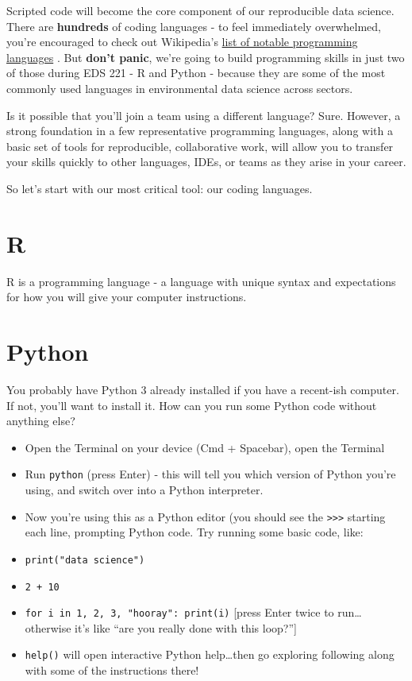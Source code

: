 \documentclass[
]{book}
\begin{document}
Scripted code will become the core component of our reproducible data science. There are \textbf{hundreds} of coding languages - to feel immediately overwhelmed, you're encouraged to check out Wikipedia's \href{https://en.wikipedia.org/wiki/List_of_programming_languages}{list of notable programming languages} \citep{enwiki_1014039839}. But \textbf{don't panic}, we're going to build programming skills in just two of those during EDS 221 - R and Python - because they are some of the most commonly used languages in environmental data science across sectors.

Is it possible that you'll join a team using a different language? Sure. However, a strong foundation in a few representative programming languages, along with a basic set of tools for reproducible, collaborative work, will allow you to transfer your skills quickly to other languages, IDEs, or teams as they arise in your career.

So let's start with our most critical tool: our coding languages.

\hypertarget{r}{%
\section{R}\label{r}}

R is a programming language - a language with unique syntax and expectations for how you will give your computer instructions.

\hypertarget{python}{%
\section{Python}\label{python}}

You probably have Python 3 already installed if you have a recent-ish computer. If not, you'll want to install it. How can you run some Python code without anything else?

\begin{itemize}
\item
  Open the Terminal on your device (Cmd + Spacebar), open the Terminal
\item
  Run \texttt{python} (press Enter) - this will tell you which version of Python you're using, and switch over into a Python interpreter.
\item
  Now you're using this as a Python editor (you should see the \texttt{\textgreater{}\textgreater{}\textgreater{}} starting each line, prompting Python code. Try running some basic code, like:
\item
  \texttt{print("data\ science")}
\item
  \texttt{2\ +\ 10}
\item
  \texttt{for\ i\ in\ 1,\ 2,\ 3,\ "hooray":\ print(i)} {[}press Enter twice to run\ldots otherwise it's like ``are you really done with this loop?''{]}
\item
  \texttt{help()} will open interactive Python help\ldots then go exploring following along with some of the instructions there!
\end{itemize}
\end{document}
